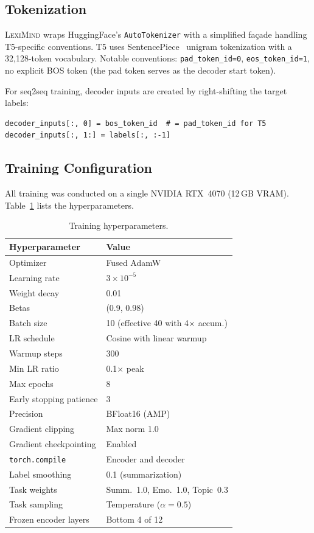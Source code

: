 \documentclass[11pt,a4paper]{article}
\newcommand{\lexiname}{\textsc{LexiMind}}
\begin{document}
\subsection{Tokenization}

\lexiname{} wraps HuggingFace's \texttt{AutoTokenizer} with a simplified fa\c{c}ade handling T5-specific conventions.
T5 uses SentencePiece~\citep{kudo2018sentencepiece} unigram tokenization with a 32{,}128-token vocabulary.
Notable conventions: \texttt{pad\_token\_id=0}, \texttt{eos\_token\_id=1}, no explicit BOS token (the pad token serves as the decoder start token).

For seq2seq training, decoder inputs are created by right-shifting the target labels:

\begin{lstlisting}[caption={Decoder input preparation},numbers=none]
decoder_inputs[:, 0] = bos_token_id  # = pad_token_id for T5
decoder_inputs[:, 1:] = labels[:, :-1]
\end{lstlisting}

\subsection{Training Configuration}

All training was conducted on a single NVIDIA RTX~4070 (12\,GB VRAM).
Table~\ref{tab:training_config} lists the hyperparameters.

\begin{table}[t]
\centering
\caption{Training hyperparameters.}
\label{tab:training_config}
\small
\begin{tabular}{@{}ll@{}}
\toprule
\textbf{Hyperparameter} & \textbf{Value} \\
\midrule
Optimizer & Fused AdamW \\
Learning rate & $3 \times 10^{-5}$ \\
Weight decay & 0.01 \\
Betas & (0.9, 0.98) \\
Batch size & 10 (effective 40 with 4$\times$ accum.) \\
LR schedule & Cosine with linear warmup \\
Warmup steps & 300 \\
Min LR ratio & 0.1$\times$ peak \\
Max epochs & 8 \\
Early stopping patience & 3 \\
Precision & BFloat16 (AMP) \\
Gradient clipping & Max norm 1.0 \\
Gradient checkpointing & Enabled \\
\texttt{torch.compile} & Encoder and decoder \\
Label smoothing & 0.1 (summarization) \\
Task weights & Summ.~1.0, Emo.~1.0, Topic~0.3 \\
Task sampling & Temperature ($\alpha = 0.5$) \\
Frozen encoder layers & Bottom 4 of 12 \\
\bottomrule
\end{tabular}
\end{table}
\end{document}
